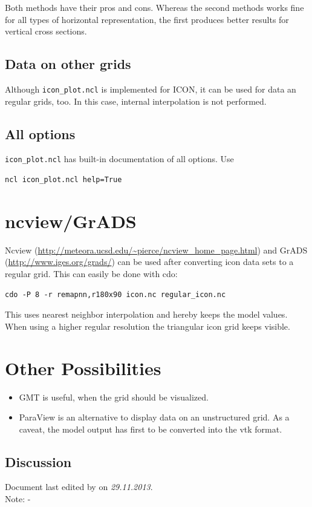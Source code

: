 Both methods have their pros and cons. Whereas the second methods works fine for all types of horizontal representation, the first produces better results for vertical cross sections.

\subsection{Data on other grids}
Although {\tt icon\_plot.ncl} is implemented for ICON, it can be used for data an regular grids, too. In this case, internal interpolation is not performed.

\subsection{All options}\label{all_options}
{\tt icon\_plot.ncl} has built-in documentation of all options. Use
\begin{small}
\begin{verbatim}
ncl icon_plot.ncl help=True 
\end{verbatim}
\end{small}


\section{ncview/GrADS}
Ncview (\href{http://meteora.ucsd.edu/~pierce/ncview_home_page.html}{http://meteora.ucsd.edu/\~{}pierce/ncview\_home\_page.html}) and GrADS (\href{http://www.iges.org/grads/}{http://www.iges.org/grads/}) can be used after converting icon data sets to a regular grid. This can easily be done with cdo:
\begin{small}
\begin{verbatim}
cdo -P 8 -r remapnn,r180x90 icon.nc regular_icon.nc
\end{verbatim}
\end{small}
This uses nearest neighbor interpolation and hereby keeps the model values. When using a higher regular resolution the triangular icon grid keeps visible.

\section{Other Possibilities}
\begin{itemize}
\item GMT is useful, when the grid should be visualized.
\item ParaView is an alternative to display data on an unstructured grid. As a caveat, the model output has first to be converted into the vtk format.
\end{itemize}


\newpage
\subsection*{Discussion}

Document last edited by \textit{\krauti} on \textit{29.11.2013}.\\
Note: -
